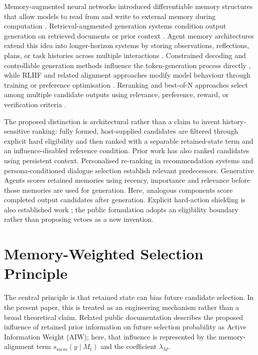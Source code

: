 \documentclass[11pt]{article}
\begin{document}
Memory-augmented neural networks introduced differentiable memory structures that allow models to read from and write to external memory during computation \citep{graves2014ntm,graves2016dnc,weston2015memory,sukhbaatar2015end}. Retrieval-augmented generation systems condition output generation on retrieved documents or prior context \citep{lewis2020rag,guu2020realm,borgeaud2022retro,izacard2021fid}. Agent memory architectures extend this idea into longer-horizon systems by storing observations, reflections, plans, or task histories across multiple interactions \citep{park2023generative,shinn2023reflexion,packer2023memgpt,wang2023voyager}. Constrained decoding and controllable generation methods influence the token-generation process directly \citep{dathathri2019pplm,krause2021gedi,yang2021fudge,beurer2023prompting,willard2023efficient}, while RLHF and related alignment approaches modify model behaviour through training or preference optimisation \citep{ouyang2022training,bai2022constitutional,bai2022helpful}. Reranking and best-of-N approaches select among multiple candidate outputs using relevance, preference, reward, or verification criteria \citep{nogueira2019passage,burges2010ranknet,liu2009learning,stiennon2020learning,nakano2021webgpt,lightman2023verify,cobbe2021training}.

The proposed distinction is architectural rather than a claim to invent history-sensitive ranking: fully formed, host-supplied candidates are filtered through explicit hard eligibility and then ranked with a separable retained-state term and an influence-disabled reference condition. Prior work has also ranked candidates using persistent context. Personalised re-ranking in recommendation systems \citep{pei2019personalized} and persona-conditioned dialogue selection \citep{zhang2018personalizing} establish relevant predecessors. Generative Agents \citep{park2023generative} scores retained memories using recency, importance and relevance before those memories are used for generation. Here, analogous components score completed output candidates after generation. Explicit hard-action shielding is also established work \citep{alshiekh2018shielding}; the public formulation adopts an eligibility boundary rather than proposing vetoes as a new invention.

\section{Memory-Weighted Selection Principle}

The central principle is that retained state can bias future candidate selection. In the present paper, this is treated as an engineering mechanism rather than a broad theoretical claim. Related public documentation describes the proposed influence of retained prior information on future selection probability as Active Information Weight (AIW); here, that influence is represented by the memory-alignment term $s_{mem}(y \mid M_t)$ and the coefficient $\lambda_M$.
\end{document}
